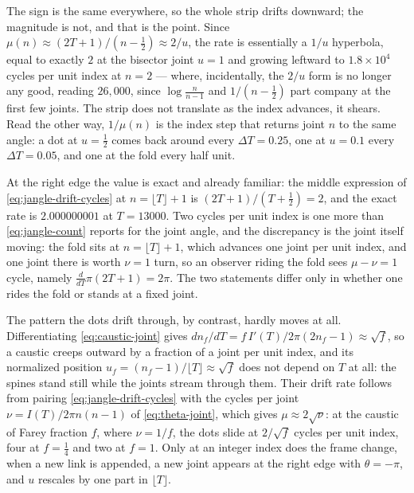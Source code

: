 \documentclass[11pt]{article}
\theoremstyle{definition}
\begin{document}
The sign is the same everywhere, so the whole strip drifts downward; the
magnitude is not, and that is the point. Since
$\mu(n)\approx(2T+1)/(n-\tfrac12)\approx2/u$, the rate is essentially a $1/u$
hyperbola, equal to exactly $2$ at the bisector joint $u=1$ and growing leftward
to $1.8\times10^{4}$ cycles per unit index at $n=2$ --- where, incidentally, the
$2/u$ form is no longer any good, reading $26{,}000$, since
$\log\frac{n}{n-1}$ and $1/(n-\tfrac12)$ part company at the first few joints.
The strip does not translate as the index advances, it shears. Read the other
way, $1/\mu(n)$ is the index step that returns joint $n$ to the same angle: a
dot at $u=\tfrac12$ comes back around every $\Delta T=0.25$, one at $u=0.1$
every $\Delta T=0.05$, and one at the fold every half unit.

At the right edge the value is exact and already familiar: the middle expression
of \eqref{eq:jangle-drift-cycles} at $n=\lfloor T\rfloor+1$ is
$(2T+1)/(T+\tfrac12)=2$, and the exact rate is $2.000000001$ at $T=13000$. Two
cycles per unit index is one more than \eqref{eq:jangle-count} reports for the
joint angle, and the discrepancy is the joint itself moving: the fold sits at
$n=\lfloor T\rfloor+1$, which advances one joint per unit index, and one joint
there is worth $\nu=1$ turn, so an observer riding the fold sees $\mu-\nu=1$
cycle, namely $\frac{d}{dT}\pi(2T+1)=2\pi$. The two statements differ only in
whether one rides the fold or stands at a fixed joint.

The pattern the dots drift through, by contrast, hardly moves at all.
Differentiating \eqref{eq:caustic-joint} gives
$dn_f/dT=f\,I'(T)\big/2\pi(2n_f-1)\approx\sqrt f$, so a caustic creeps outward
by a fraction of a joint per unit index, and its normalized position
$u_f=(n_f-1)/\lfloor T\rfloor\approx\sqrt f$ does not depend on $T$ at all: the
spines stand still while the joints stream through them. Their drift rate
follows from pairing \eqref{eq:jangle-drift-cycles} with the cycles per joint
$\nu=I(T)/2\pi n(n-1)$ of \eqref{eq:theta-joint}, which gives
$\mu\approx2\sqrt\nu$: at the caustic of Farey fraction $f$, where $\nu=1/f$,
the dots slide at $2/\sqrt f$ cycles per unit index, four at $f=\tfrac14$ and
two at $f=1$. Only at an integer index does the frame change, when a new link is
appended, a new joint appears at the right edge with $\theta=-\pi$, and $u$
rescales by one part in $\lfloor T\rfloor$.
\end{document}
